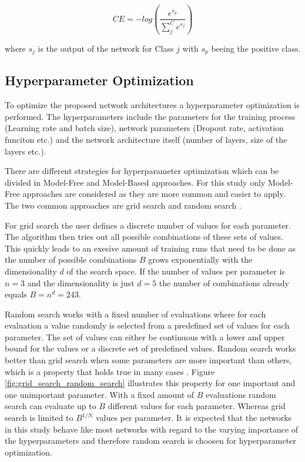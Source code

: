 \documentclass[conference]{IEEEtran}
\begin{document}
\begin{equation}
	\label{eq:categorical-cross-entrophy}
	CE = -log(\frac{e^{s_p}}{\sum_{j}^{C} e^{s_j}})	
\end{equation}

where $ s_j $ is the output of the network for Class $ j $ with $ s_p $ beeing the positive class.


\noindent
\subsection{Hyperparameter Optimization}

To optimize the proposed network architectures a hyperparameter optimization is performed. The hyperparameters include the parameters for the training process (Learning rate and batch size), network parameters (Dropout rate, activation funciton etc.) and the network architecture itself (number of layers, size of the layers etc.).

There are different strategies for hyperparameter optimization which can be divided in Model-Free and Model-Based approaches. For this study only Model-Free approaches are considered as they are more common and easier to apply. The two common approaches are grid search and random search \cite{Feurer2019}. 

For grid search the user defines a discrete number of values for each parameter. The algorithm then tries out all possible combinations of these sets of values. This quickly leads to an exesive amount of training runs that need to be done as the number of possible combinations $ B $ grows exponentially with the dimensionality $ d $ of the search space. If the number of values per parameter is $ n = 3 $ and the dimensionality is just $ d = 5 $ the number of combinations already equals $ B = n^d = 243 $.

Random search works with a fixed number of evaluations where for each evaluation a value randomly is selected from a predefined set of values for each parameter. The set of values can either be continuous with a lower and upper bound for the values or a discrete set of predefined values. Random search works better than grid search when some parameters are more important than others, which is a property that holds true in many cases \cite{Feurer2019}. Figure \ref{fig:grid_search_random_search} illustrates this property for one important and one unimportant parameter. With a fixed amount of $ B $ evaluations random search can evaluate up to $ B $ different values for each parameter. Whereas grid search is limited to $ B^{1/N} $ values per parameter. It is expected that the networks in this study behave like most networks with regard to the varying importance of the hyperparameters and therefore random search is choosen for hyperparameter optimization.
\end{document}

